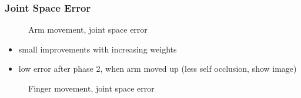\subsubsection{Joint Space Error}

\begin{figure}
\centering
{}
\caption{Arm movement, joint space error}
\end{figure}

\begin{itemize}
\item small improvements with increasing weights
\item low error after phase 2, when arm moved up (less self occlusion, show image)
\end{itemize}


\begin{figure}
\centering
{}
\caption{Finger movement, joint space error}
\end{figure}

